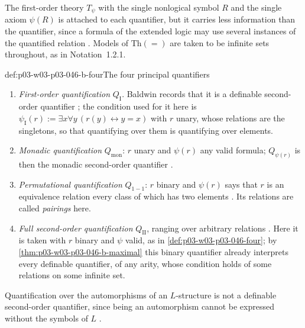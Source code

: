 The first-order theory \(T_\psi\) with the single nonlogical symbol \(R\)
and the single axiom \(\psi(R)\) is attached to each quantifier, but it
carries less information than the quantifier, since a formula of the
extended logic may use several instances of the quantified relation
\cite[p.~447]{Baldwin1985DSOQ}. Models of \(\mathrm{Th}(=)\) are taken to be
infinite sets throughout, as in Notation~1.2.1.

\begin{hbdefinition}{def:p03-w03-p03-046-b-four}{The four principal quantifiers}
\begin{enumerate}
  \item \emph{First-order quantification} \(Q_{\mathrm I}\). Baldwin
        records that it is a definable second-order quantifier
        \cite[p.~447]{Baldwin1985DSOQ}; the condition used for it here is
        \(\psi_{\mathrm I}(r):=\exists x\forall y\,(r(y)\leftrightarrow
        y=x)\) with \(r\) unary, whose relations are the singletons, so
        that quantifying over them is quantifying over elements.
  \item \emph{Monadic quantification} \(Q_{\mathrm{mon}}\): \(r\) unary
        and \(\psi(r)\) any valid formula; \(Q_{\psi(r)}\) is then the
        monadic second-order quantifier \cite[p.~447]{Baldwin1985DSOQ}.
  \item \emph{Permutational quantification} \(Q_{1-1}\): \(r\) binary and
        \(\psi(r)\) says that \(r\) is an equivalence relation every class
        of which has two elements \cite[p.~447]{Baldwin1985DSOQ}. Its
        relations are called \emph{pairings} here.
  \item \emph{Full second-order quantification} \(Q_{\mathrm{II}}\),
        ranging over arbitrary relations \cite[pp.~445, 447]{Baldwin1985DSOQ}.
        Here it is taken with \(r\) binary and \(\psi\) valid, as in
        \cref{def:p03-w03-p03-046-four}; by
        \cref{thm:p03-w03-p03-046-b-maximal} this binary quantifier already
        interprets every definable quantifier, of any arity, whose
        condition holds of some relations on some infinite set.
\end{enumerate}
\end{hbdefinition}

Quantification over the automorphisms of an \(L\)-structure is not a
definable second-order quantifier, since being an automorphism cannot be
expressed without the symbols of \(L\) \cite[p.~447]{Baldwin1985DSOQ}.


